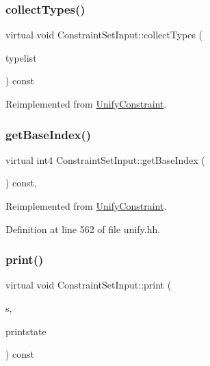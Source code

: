 \subsubsection{\texorpdfstring{collectTypes()}{collectTypes()}}
{\footnotesize\ttfamily virtual void Constraint\+Set\+Input\+::collect\+Types (\begin{DoxyParamCaption}\item[{vector$<$ \mbox{\hyperlink{class_unify_datatype}{Unify\+Datatype}} $>$ \&}]{typelist }\end{DoxyParamCaption}) const\hspace{0.3cm}{\ttfamily [virtual]}}



Reimplemented from \mbox{\hyperlink{class_unify_constraint_acb83b6bea3b21e13054e72ac9cfaba0f}{Unify\+Constraint}}.

\mbox{\label{class_constraint_set_input_af83fc0a5dbaa89f9612245241c05d0c8}} 
\subsubsection{\texorpdfstring{getBaseIndex()}{getBaseIndex()}}
{\footnotesize\ttfamily virtual int4 Constraint\+Set\+Input\+::get\+Base\+Index (\begin{DoxyParamCaption}\item[{void}]{ }\end{DoxyParamCaption}) const\hspace{0.3cm}{\ttfamily [inline]}, {\ttfamily [virtual]}}



Reimplemented from \mbox{\hyperlink{class_unify_constraint_a44f0164f38ac1fdc44fc73ebe7678de1}{Unify\+Constraint}}.



Definition at line 562 of file unify.\+hh.

\mbox{\label{class_constraint_set_input_a7f3aa6e111956cbbb1f5c1e0c42c5068}} 
\subsubsection{\texorpdfstring{print()}{print()}}
{\footnotesize\ttfamily virtual void Constraint\+Set\+Input\+::print (\begin{DoxyParamCaption}\item[{ostream \&}]{s,  }\item[{\mbox{\hyperlink{class_unify_c_printer}{Unify\+C\+Printer}} \&}]{printstate }\end{DoxyParamCaption}) const\hspace{0.3cm}{\ttfamily [virtual]}}



